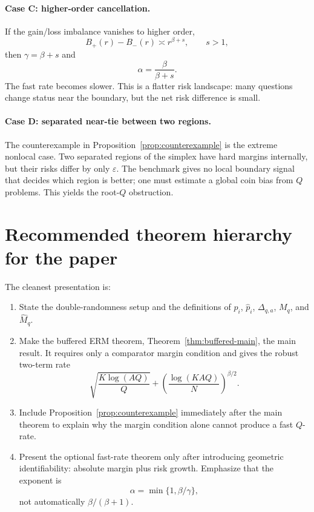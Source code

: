 \documentclass[11pt]{article}
\newcommand{\eps}{\varepsilon}
\begin{document}
\paragraph{Case C: higher-order cancellation.}
If the gain/loss imbalance vanishes to higher order,
\[
B_+(r)-B_-(r)\asymp r^{\beta+s},
\qquad s>1,
\]
then $\gamma=\beta+s$ and
\[
\alpha=\frac{\beta}{\beta+s}.
\]
The fast rate becomes slower.  This is a flatter risk landscape: many questions change status near the boundary, but the net risk difference is small.

\paragraph{Case D: separated near-tie between two regions.}
The counterexample in Proposition~\ref{prop:counterexample} is the extreme nonlocal case.  Two separated regions of the simplex have hard margins internally, but their risks differ by only $\eps$.  The benchmark gives no local boundary signal that decides which region is better; one must estimate a global coin bias from $Q$ problems.  This yields the root-$Q$ obstruction.

\section{Recommended theorem hierarchy for the paper}

The cleanest presentation is:

\begin{enumerate}[label=(\roman*)]
\item State the double-randomness setup and the definitions of $p_i$, $\widehat p_i$, $\Delta_{q,a}$, $M_q$, and $\widehat M_q$.

\item Make the buffered ERM theorem, Theorem~\ref{thm:buffered-main}, the main result.  It requires only a comparator margin condition and gives the robust two-term rate
\[
\sqrt{\frac{K\log(AQ)}{Q}}
+
\left(\frac{\log(KAQ)}{N}\right)^{\beta/2}.
\]

\item Include Proposition~\ref{prop:counterexample} immediately after the main theorem to explain why the margin condition alone cannot produce a fast $Q$-rate.

\item Present the optional fast-rate theorem only after introducing geometric identifiability: absolute margin plus risk growth.  Emphasize that the exponent is
\[
\alpha=\min\{1,\beta/\gamma\},
\]
not automatically $\beta/(\beta+1)$.
\end{enumerate}
\end{document}
